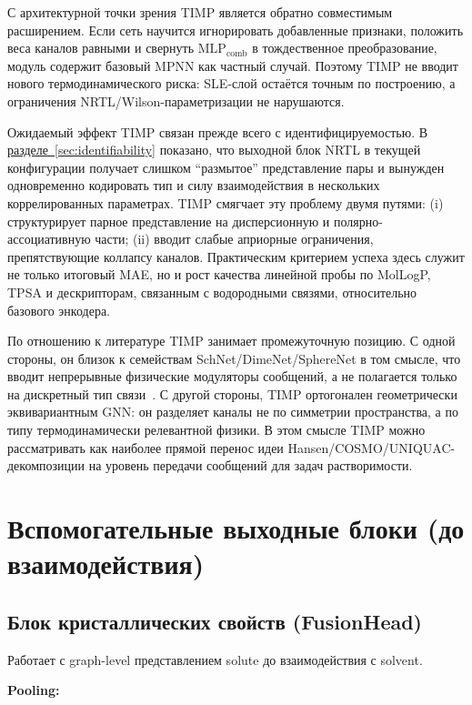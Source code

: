 \documentclass[11pt]{article}
\begin{document}
С архитектурной точки зрения TIMP является обратно совместимым расширением. Если сеть научится игнорировать добавленные признаки, положить веса каналов равными и свернуть $\mathrm{MLP}_{\mathrm{comb}}$ в тождественное преобразование, модуль содержит базовый MPNN как частный случай. Поэтому TIMP не вводит нового термодинамического риска: SLE-слой остаётся точным по построению, а ограничения NRTL/Wilson-параметризации не нарушаются.

Ожидаемый эффект TIMP связан прежде всего с идентифицируемостью. В \hyperref[sec:identifiability]{разделе~\ref*{sec:identifiability}} показано, что выходной блок NRTL в текущей конфигурации получает слишком ``размытое'' представление пары и вынужден одновременно кодировать тип и силу взаимодействия в нескольких коррелированных параметрах. TIMP смягчает эту проблему двумя путями: (i) структурирует парное представление на дисперсионную и полярно-ассоциативную части; (ii) вводит слабые априорные ограничения, препятствующие коллапсу каналов. Практическим критерием успеха здесь служит не только итоговый MAE, но и рост качества линейной пробы по MolLogP, TPSA и дескрипторам, связанным с водородными связями, относительно базового энкодера.

По отношению к литературе TIMP занимает промежуточную позицию. С одной стороны, он близок к семействам SchNet/DimeNet/SphereNet в том смысле, что вводит непрерывные физические модуляторы сообщений, а не полагается только на дискретный тип связи~\cite{schutt2018,gasteiger2020,liu2022}. С другой стороны, TIMP ортогонален геометрически эквивариантным GNN: он разделяет каналы не по симметрии пространства, а по типу термодинамически релевантной физики. В этом смысле TIMP можно рассматривать как наиболее прямой перенос идеи Hansen/COSMO/UNIQUAC-декомпозиции на уровень передачи сообщений для задач растворимости.

\section{Вспомогательные выходные блоки (до взаимодействия)}

\subsection{Блок кристаллических свойств (FusionHead)}

Работает с graph-level представлением solute до взаимодействия с solvent.

\textbf{Pooling:}
\end{document}
